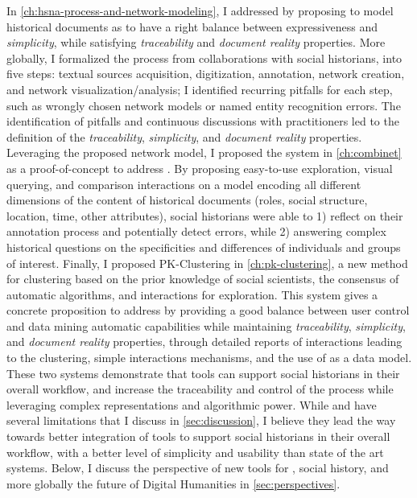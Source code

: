 In \autoref{ch:hsna-process-and-network-modeling}, I addressed \qone by proposing to model historical documents as \modelplural to have a right balance between expressiveness and \emph{simplicity}, while satisfying \emph{traceability} and \emph{document reality} properties.
More globally, I formalized the \hsna process from collaborations with social historians, into five steps: textual sources acquisition, digitization, annotation, network creation, and network visualization/analysis; I identified recurring pitfalls for each step, such as wrongly chosen network models or named entity recognition errors.
The identification of pitfalls and continuous discussions with practitioners led to the definition of the \emph{traceability}, \emph{simplicity}, and \emph{document reality} properties.
Leveraging the proposed network model, I proposed the \combinet system in \autoref{ch:combinet} as a proof-of-concept to address \qtwo.
By proposing easy-to-use exploration, visual querying, and comparison interactions on a model encoding all different dimensions of the content of historical documents (roles, social structure, location, time, other attributes), social historians were able to 1) reflect on their annotation process and potentially detect errors, while 2) answering complex historical questions on the specificities and differences of individuals and groups of interest.
Finally, I proposed PK-Clustering in \autoref{ch:pk-clustering}, a new method for clustering based on the prior knowledge of social scientists, the consensus of automatic algorithms, and interactions for exploration.
This system gives a concrete proposition to address \qthree by providing a good balance between user control and data mining automatic capabilities while maintaining \emph{traceability}, \emph{simplicity}, and \emph{document reality} properties, through detailed reports of interactions leading to the clustering, simple interactions mechanisms, and the use of \modelplural as a data model.
These two systems demonstrate that \va tools can support social historians in their overall workflow, and increase the traceability and control of the process while leveraging complex representations and algorithmic power.
While \combinet and \pkclustering have several limitations that I discuss in \autoref{sec:discussion}, I believe they lead the way towards better integration of \va tools to support social historians in their overall workflow, with a better level of simplicity and usability than state of the art systems.
Below, I discuss the perspective of new \va tools for \hsna, social history, and more globally the future of Digital Humanities in \autoref{sec:perspectives}.



